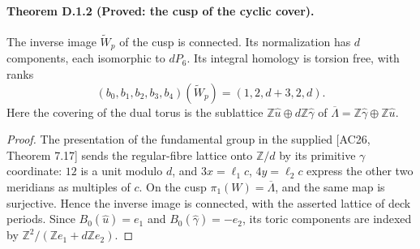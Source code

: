 \paragraph{Theorem D.1.2 (Proved: the cusp of the cyclic cover).}
The inverse image $\widetilde W_p$ of the cusp is connected. Its
normalization has $d$ components, each isomorphic to $dP_6$. Its
integral homology is torsion free, with ranks
\[
 (b_0,b_1,b_2,b_3,b_4)(\widetilde W_p)=(1,2,d+3,2,d).
\]
Here the covering of the dual torus is the sublattice
$\mathbb Z\widehat u\oplus d\mathbb Z\widehat\gamma$ of
$\overline\Lambda=\mathbb Z\widehat\gamma\oplus\mathbb Z\widehat u$.
\begin{proof}
The presentation of the fundamental group in the supplied
\textup{[AC26, Theorem 7.17]} sends the regular-fibre lattice onto
$\mathbb Z/d$ by its primitive $\gamma$ coordinate: $12$ is a unit
modulo $d$, and $3x=\ell_1c$, $4y=\ell_2c$ express the other two
meridians as multiples of $c$. On the cusp $\pi_1(W)=\overline\Lambda$,
and the same map is surjective. Hence the inverse image is connected,
with the asserted lattice of deck periods. Since
$B_0(\widehat u)=e_1$ and $B_0(\widehat\gamma)=-e_2$, its toric
components are indexed by $\mathbb Z^2/(\mathbb Ze_1+d\mathbb Ze_2)$.


\end{proof}
